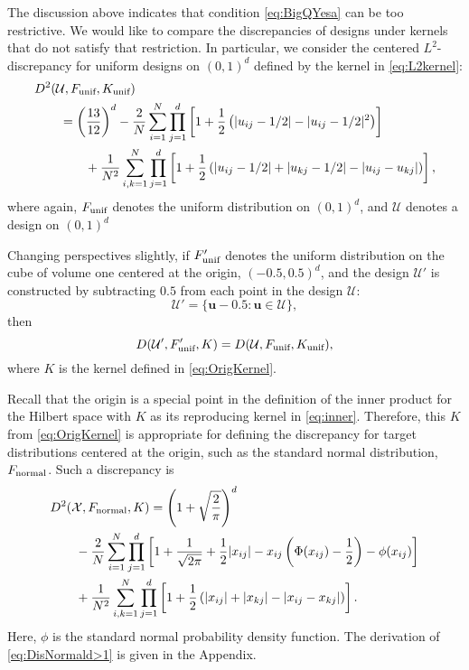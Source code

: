 \documentclass[graybox]{svmult}
\newcommand{\vu}{\boldsymbol{u}}
\newcommand{\Udes}{\mathcal{U}}
\newcommand{\Xdes}{\mathcal{X}}
\newcommand{\unif}{\textup{unif}}
\newcommand{\normal}{\textup{normal}}
\begin{document}
The discussion above indicates that condition \eqref{eq:BigQYesa} can be too restrictive.  We would like to compare the discrepancies of designs under kernels that do not satisfy that restriction.  In particular, we consider the centered $L^2$-discrepancy for uniform designs on $(0,1)^d$ defined by the kernel in \eqref{eq:L2kernel}:
\begin{align*}
\MoveEqLeft{D^2(\Udes, F_\unif, K_\unif)} \\
& = \left(\frac{13}{12}\right)^d - \frac{2}{N}\sum_{i=1}^N \prod_{j=1}^d \left[1+\frac{1}{2}\left(|u_{ij}-1/2|-|u_{ij}-1/2|^2\right) \right]\\
& \qquad + \frac{1}{N^2}\sum_{i,k=1}^N\prod_{j=1}^d\left[1+\frac{1}{2}\left(|u_{ij}-1/2|+|u_{kj}-1/2|-|u_{ij}-u_{kj}| \right) \right],  
\end{align*}
where again, $F_\unif$ denotes the uniform distribution on $(0,1)^d$, and $\Udes$ denotes a design on $(0,1)^d$

Changing perspectives slightly, if $F_\unif'$ denotes the uniform distribution on the cube of volume one centered at the origin, $(-0.5,0.5)^d$, and the design $\Udes'$ is constructed by  subtracting $\boldsymbol{0.5}$ from each point in the design $\Udes$:
\begin{equation} \label{eq:Updef}
    \Udes' = \{\vu -\boldsymbol{0.5} : \vu \in \Udes \},
\end{equation}
then 
\begin{equation*} \label{eq:desEquiv}
     D(\Udes',F'_\unif,K) = D(\Udes, F_\unif, K_\unif),
\end{equation*}
where $K$ is the kernel defined in \eqref{eq:OrigKernel}.  

Recall that the origin is a special point in the definition of the inner product for the Hilbert space with $K$ as its reproducing kernel in \eqref{eq:inner}.  Therefore, this $K$ from \eqref{eq:OrigKernel} is appropriate for defining the discrepancy for target distributions centered at the origin, such as the standard normal distribution, $F_\normal$.  Such a discrepancy is 
\begin{align}
\nonumber
\MoveEqLeft{D^2(\Xdes, F_\normal, K) = \left(1+\sqrt{\frac{2}{\pi}}\right)^d}\\
\nonumber
  & - \frac{2}{N}\sum_{i=1}^N \prod\limits_{j=1}^d\left[ 1+\frac{1}{\sqrt{2\pi}}+\frac{1}{2}|x_{ij}|-x_{ij}\left(\Phi(x_{ij})-\frac 12 \right)-\phi(x_{ij})\right]\\
  &+\frac{1}{N^2}\sum_{i,k=1}^N \prod_{j=1}^d \left[1+\frac{1}{2}\left(|x_{ij}|+|x_{kj}|-|x_{ij}-x_{kj}|\right)\right]. 
  \label{eq:DisNormald>1}
\end{align}
Here, $\phi$ is the standard normal probability density function. 
The derivation of \eqref{eq:DisNormald>1} is given in the Appendix. 
\end{document}
